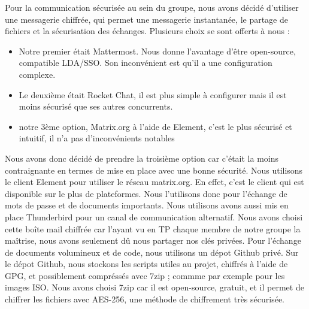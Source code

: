 \documentclass[../Livrable1.tex]{subfiles}
\begin{document}
Pour la communication sécurisée au sein du groupe, nous avons décidé d'utiliser une messagerie chiffrée, qui permet une messagerie instantanée, le partage de fichiers et la sécurisation des échanges.
Plusieurs choix se sont offerts à nous :
\begin{itemize}
    \item Notre premier était Mattermost. Nous donne l'avantage d'être open-source, compatible LDA/SSO. Son inconvénient est qu'il a une configuration complexe.
    \item Le deuxième était Rocket Chat, il est plus simple à configurer mais il est moins sécurisé que ses autres concurrents.
    \item notre 3ème option, Matrix.org à l'aide de Element, c'est le plus sécurisé et intuitif, il n'a pas d'inconvénients notables
\end{itemize}
Nous avons donc décidé de prendre la troisième option car c'était la moins contraignante en termes de mise en place avec une bonne sécurité.
Nous utilisons le client Element pour utiliser le réseau matrix.org. En effet, c'est le client qui est disponible sur le plus de plateformes.
Nous l'utilisons donc pour l'échange de mots de passe et de documents importants.
Nous utilisons avons aussi mis en place Thunderbird pour un canal de communication alternatif.
Nous avons choisi cette boîte mail chiffrée car l'ayant vu en TP chaque membre de notre groupe la maîtrise, nous avons seulement dû nous partager nos clés privées.
Pour l'échange de documents volumineux et de code, nous utilisons un dépot Github privé.
Sur le dépot Github, nous stockons les scripts utiles au projet, chiffrés à l'aide de GPG, et possiblement compréssés avec 7zip ; commme par exemple pour les images ISO.
Nous avons choisi 7zip car il est open-source, gratuit, et il permet de chiffrer les fichiers avec AES-256, une méthode de chiffrement très sécurisée.
\end{document}
